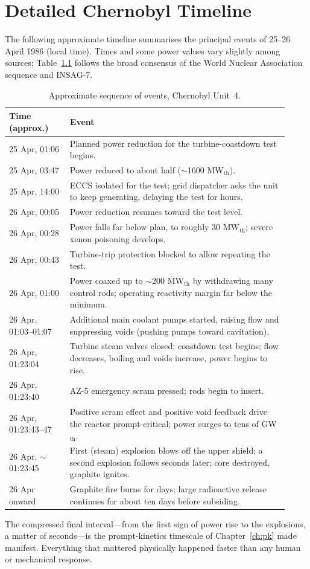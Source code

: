 \chapter{Detailed Chernobyl Timeline}
\label{app:timeline}

The following approximate timeline summarises the principal events of 25--26 April
1986 (local time). Times and some power values vary slightly among sources;
Table~\ref{tab:timeline} follows the broad consensus of the World Nuclear
Association sequence and INSAG-7.

\begin{table}[H]
\centering
\caption{Approximate sequence of events, Chernobyl Unit~4.}
\label{tab:timeline}
\renewcommand{\arraystretch}{1.2}
\begin{tabular}{p{0.20\linewidth} p{0.72\linewidth}}
\toprule
\textbf{Time (approx.)} & \textbf{Event} \\
\midrule
25 Apr, 01:06 & Planned power reduction for the turbine-coastdown test begins. \\
25 Apr, 03:47 & Power reduced to about half ($\sim$1600 MW$_\text{th}$). \\
25 Apr, 14:00 & ECCS isolated for the test; grid dispatcher asks the unit to keep
generating, delaying the test for hours. \\
26 Apr, 00:05 & Power reduction resumes toward the test level. \\
26 Apr, 00:28 & Power falls far below plan, to roughly 30 MW$_\text{th}$; severe
xenon poisoning develops. \\
26 Apr, 00:43 & Turbine-trip protection blocked to allow repeating the test. \\
26 Apr, 01:00 & Power coaxed up to $\sim$200 MW$_\text{th}$ by withdrawing many
control rods; operating reactivity margin far below the minimum. \\
26 Apr, 01:03--01:07 & Additional main coolant pumps started, raising flow and
suppressing voids (pushing pumps toward cavitation). \\
26 Apr, 01:23:04 & Turbine steam valves closed; coastdown test begins; flow
decreases, boiling and voids increase, power begins to rise. \\
26 Apr, 01:23:40 & AZ-5 emergency scram pressed; rods begin to insert. \\
26 Apr, 01:23:43--47 & Positive scram effect and positive void feedback drive the
reactor prompt-critical; power surges to tens of GW$_\text{th}$. \\
26 Apr, $\sim$01:23:45 & First (steam) explosion blows off the upper shield; a
second explosion follows seconds later; core destroyed, graphite ignites. \\
26 Apr onward & Graphite fire burns for days; large radioactive release continues
for about ten days before subsiding. \\
\bottomrule
\end{tabular}
\end{table}

The compressed final interval---from the first sign of power rise to the
explosions, a matter of seconds---is the prompt-kinetics timescale of
Chapter~\ref{ch:pk} made manifest. Everything that mattered physically happened
faster than any human or mechanical response.
